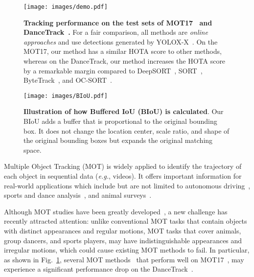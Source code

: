 \documentclass[journal]{IEEEtran}
\newcommand{\eg}{{\it e.g.}}
\begin{document}
\begin{figure}[h!]
\centering
       \texttt{[image: images/demo.pdf]}
       \caption{\textbf{Tracking performance on the test sets of MOT17~\cite{MOT16} and DanceTrack~\cite{sun2022dancetrack}.} For a fair comparison, all methods are \textit{online approaches} and use detections generated by YOLOX-X~\cite{ge2021yolox}. On the MOT17, our method has a similar HOTA score to other methods, whereas on the DanceTrack, our method increases the HOTA score by a remarkable margin compared to DeepSORT~\cite{DeepSORT}, SORT~\cite{SORT}, ByteTrack~\cite{bytetrack}, and OC-SORT~\cite{cao2022observation}.}
       \label{fig:demo}
\end{figure}


\begin{figure}[th!]
   \centering
   \texttt{[image: images/BIoU.pdf]}
   \caption{\textbf{Illustration of how Buffered IoU (BIoU) is calculated}. Our BIoU adds a buffer that is proportional to the original bounding box. It does not change the location center, scale ratio, and shape of the original bounding boxes but expands the original matching space.}
   \label{fig:BIoU}
\end{figure}


Multiple Object Tracking (MOT) is widely applied to identify the trajectory of each object in sequential data (\eg, videos). It offers important information for real-world applications which include but are not limited to autonomous driving~\cite{KITTI}, sports and dance analysis~\cite{sun2022dancetrack,cioppa2022soccernet}, and animal surveys~\cite{bai2021gmot,lauer2022multi}. 

Although MOT studies have been greatly developed~\cite{SORT,DeepSORT,JDE,FairMOT,bytetrack, Li_2022_CVPR},  a new challenge has recently attracted attention: unlike conventional MOT tasks that contain objects with distinct appearances and regular motions, MOT tasks that cover animals, group dancers, and sports players, may have indistinguishable appearances and irregular motions, which could cause existing MOT methods to fail. In particular, as shown in Fig.~\ref{fig:demo}, several MOT methods~\cite{SORT, DeepSORT, bytetrack, cao2022observation} that perform well on MOT17~\cite{MOT16}, may experience a significant performance drop on the DanceTrack~\cite{sun2022dancetrack}.
\end{document}
